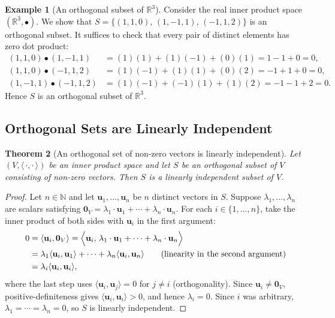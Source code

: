 \documentclass[11pt, a4paper, notitlepage]{report}
\newtheorem{theorem}{Theorem}[section]
\theoremstyle{definition}
\newtheorem{example}[theorem]{Example}
\theoremstyle{remark}
\begin{document}
\begin{example}[An orthogonal subset of $\mathbb{R}^3$]
\label{ex:orthogonal-subset-R3}
Consider the real inner product space $(\mathbb{R}^3,\bullet)$.
We show that $S = \{(1,1,0),\,(1,-1,1),\,(-1,1,2)\}$ is an orthogonal subset.
It suffices to check that every pair of distinct elements has zero dot product:
\begin{align*}
  (1,1,0)\bullet(1,-1,1)   &= (1)(1)+(1)(-1)+(0)(1) = 1-1+0 = 0,\\
  (1,1,0)\bullet(-1,1,2)   &= (1)(-1)+(1)(1)+(0)(2) = -1+1+0 = 0,\\
  (1,-1,1)\bullet(-1,1,2)  &= (1)(-1)+(-1)(1)+(1)(2) = -1-1+2 = 0.
\end{align*}
Hence $S$ is an orthogonal subset of $\mathbb{R}^3$.
\end{example}

\subsection{Orthogonal Sets are Linearly Independent}
\label{subsec:orth-lin-indep}

\begin{theorem}[An orthogonal set of non-zero vectors is linearly independent]
\label{thm:orth-lin-indep}
Let $(V,\langle\,\cdot,\cdot\,\rangle)$ be an inner product space and let $S$ be an orthogonal
subset of $V$ consisting of \emph{non-zero} vectors.
Then $S$ is a linearly independent subset of $V$.
\end{theorem}

\begin{proof}
Let $n\in\mathbb{N}$ and let $\mathbf{u}_1,\ldots,\mathbf{u}_n$ be $n$ distinct vectors in $S$.
Suppose $\lambda_1,\ldots,\lambda_n$ are scalars satisfying
$\mathbf{0}_V = \lambda_1\cdot\mathbf{u}_1+\cdots+\lambda_n\cdot\mathbf{u}_n$.
For each $i\in\{1,\ldots,n\}$, take the inner product of both sides with $\mathbf{u}_i$
in the first argument:
\begin{align*}
  0 &= \langle\mathbf{u}_i,\mathbf{0}_V\rangle
     = \Bigl\langle\mathbf{u}_i,\,\lambda_1\cdot\mathbf{u}_1+\cdots+\lambda_n\cdot\mathbf{u}_n\Bigr\rangle \\
    &= \lambda_1\langle\mathbf{u}_i,\mathbf{u}_1\rangle+\cdots+\lambda_n\langle\mathbf{u}_i,\mathbf{u}_n\rangle
     \qquad\text{(linearity in the second argument)}\\
    &= \lambda_i\langle\mathbf{u}_i,\mathbf{u}_i\rangle,
\end{align*}
where the last step uses $\langle\mathbf{u}_i,\mathbf{u}_j\rangle = 0$ for $j\neq i$ (orthogonality).
Since $\mathbf{u}_i\neq\mathbf{0}_V$, positive-definiteness gives $\langle\mathbf{u}_i,\mathbf{u}_i\rangle > 0$,
and hence $\lambda_i = 0$. Since $i$ was arbitrary, $\lambda_1 = \cdots = \lambda_n = 0$,
so $S$ is linearly independent.
\end{proof}
\end{document}

